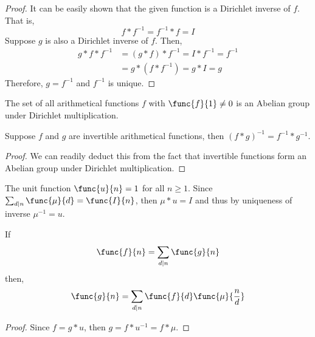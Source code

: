 \begin{proof}
    It can be easily shown that the given function is a Dirichlet inverse of \(f\). That is, 
    \begin{equation*}
        f \ast f^{-1} = f^{-1} \ast f = I
    \end{equation*}
    Suppose \(g\) is also a Dirichlet inverse of \(f\). Then, 
    \begin{align*}
        g \ast f \ast f^{-1} &= (g \ast f) \ast f^{-1} = I \ast f^{-1} = f^{-1}\\
        &= g \ast (f \ast f^{-1}) = g \ast I = g 
    \end{align*}
    Therefore, \(g= f^{-1}\) and \(f^{-1}\) is unique.
\end{proof}

\begin{remark}
    The set of all arithmetical functions \(f\) with \(\func{f}{1} \neq 0\) is an Abelian group under Dirichlet multiplication.
\end{remark}

\begin{proposition}
    Suppose \(f\) and \(g\) are invertible arithmetical functions, then \((f \ast g)^{-1} = f^{-1} \ast g^{-1}\).
\end{proposition}
\begin{proof}
    We can readily deduct this from the fact that invertible functions form an Abelian group under Dirichlet multiplication. 
\end{proof}
\begin{definition}
    The unit function \(\func{u}{n} = 1\) for all \(n \geq 1\). Since \(\sum_{d \mid n} \func{\mu}{d} = \func{I}{n}\), then \(\mu \ast u = I\) and thus by uniqueness of inverse \(\mu^{-1} = u\).
\end{definition}

\begin{theorem}
    If 
    \begin{equation*}
        \func{f}{n} = \sum_{d \mid n} \func{g}{n} 
    \end{equation*}
    then, 
    \begin{equation}
        \func{g}{n} = \sum_{d \mid n} \func{f}{d} \func{\mu}{\frac{n}{d}}
    \end{equation}
\end{theorem}
\begin{proof}
    Since \(f = g \ast u\), then \(g = f \ast u^{-1} = f \ast \mu\).
\end{proof}
